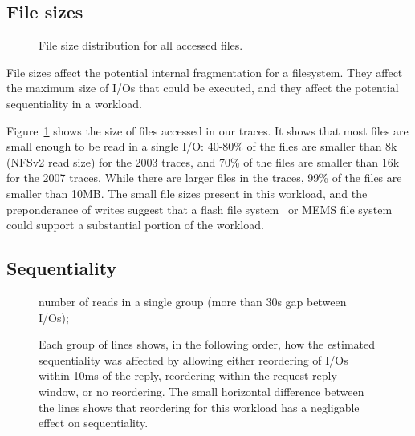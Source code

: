 \subsection{File sizes}

\begin{figure}
\caption{File size distribution for all accessed files.}
\label{fig:file-size}
\end{figure}

File sizes affect the potential internal fragmentation for a
filesystem.  They affect the maximum size of I/Os that could be
executed, and they affect the potential sequentiality in a workload.

Figure~\ref{fig:file-size} shows the size of files accessed in our
traces.  It shows that most files are small enough to be read in a single I/O: 
40-80\% of the files are smaller than 8k (NFSv2 read size) 
for the 2003 traces, and  70\% of the
files are smaller than 16k for the 2007 traces.
While there are larger files in the traces, 99\% of
the files are smaller than 10MB.  The small file sizes present in this
workload, and the preponderance of writes suggest that a flash file
system~\cite{Kawaguchi95aflash-memory} or MEMS file
system~\cite{SchlosserFast04} could support a substantial portion of
the workload.

\subsection{Sequentiality}

\begin{figure*}
\caption{number of reads in a single group (more than 30s gap between I/Os); }
\label{fig:seq-analysis}
\end{figure*}

\begin{figure}
\caption{Each group of lines shows, in the following order, how the estimated sequentiality was
affected by allowing either reordering of I/Os within 10ms of the
reply, reordering within the request-reply window, or no reordering.
The small horizontal difference between the lines shows that reordering for
this workload has a negligable effect on sequentiality.}
\label{fig:seq-bytes-compare}
\end{figure}

